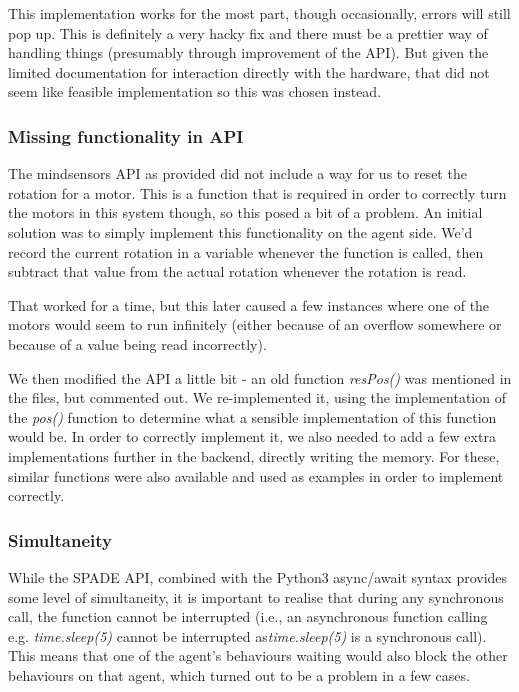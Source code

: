 \documentclass[conference]{IEEEtran}
\begin{document}
This implementation works for the most part, though occasionally, errors will still pop up. This is definitely a very hacky fix and there must be a prettier way of handling things (presumably through improvement of the API). But given the limited documentation for interaction directly with the hardware, that did not seem like feasible implementation so this was chosen instead. 

\subsubsection{Missing functionality in API}
The mindsensors API as provided did not include a way for us to reset the rotation for a motor. This is a function that is required in order to correctly turn the motors in this system though, so this posed a bit of a problem. An initial solution was to simply implement this functionality on the agent side. We'd record the current rotation in a variable whenever the function is called, then subtract that value from the actual rotation whenever the rotation is read.

That worked for a time, but this later caused a few instances where one of the motors would seem to run infinitely (either because of an overflow somewhere or because of a value being read incorrectly). 

We then modified the API a little bit - an old function \emph{resPos()} was mentioned in the files, but commented out. We re-implemented it, using the implementation of the \emph{pos()} function to determine what a sensible implementation of this function would be. In order to correctly implement it, we also needed to add a few extra implementations further in the backend, directly writing the memory. For these, similar functions were also available and used as examples in order to implement correctly.

\subsubsection{Simultaneity}

While the SPADE API, combined with the Python3 async/await syntax provides some level of simultaneity, it is important to realise that during any synchronous call, the function cannot be interrupted (i.e., an asynchronous function calling e.g. \emph{time.sleep(5)} cannot be interrupted as\emph{time.sleep(5)} is a synchronous call). This means that one of the agent's behaviours waiting would also block the other behaviours on that agent, which turned out to be a problem in a few cases.
\end{document}
